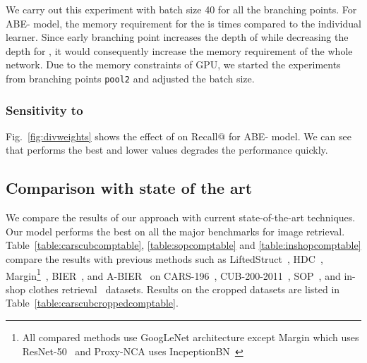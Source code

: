 \documentclass[runningheads]{llncs}
\begin{document}
We carry out this experiment with batch size 40 for all the branching points.
For ABE- model, the memory requirement for the  is  times compared to the individual learner. Since early branching point increases the depth of  while decreasing the depth for , it would consequently increase the memory requirement of the whole network.
Due to the memory constraints of GPU, we started the experiments from branching points  \texttt{pool2} and adjusted the batch size.


\subsubsection{Sensitivity to }
Fig.~\ref{fig:divweights} shows the effect of  on Recall@ for ABE- model. We can see that  performs the best and lower values degrades the performance quickly.




\subsection{Comparison with state of the art}
We compare the results of our approach with current state-of-the-art techniques.
Our model performs the best on all the major benchmarks for image retrieval.
Table~\ref{table:carscubcomptable}, \ref{table:sopcomptable} and \ref{table:inshopcomptable} compare the results with previous methods such as LiftedStruct~\cite{oh2016deep}, HDC~\cite{yuan2016hard}, Margin\footnote[2]{\label{note1}All compared methods use GoogLeNet architecture except Margin which uses ResNet-50~\cite{he2016deep}  and Proxy-NCA uses IncpeptionBN~\cite{ioffe2015batch}}~\cite{wu2017sampling}, BIER~\cite{opitz2017bier}, and A-BIER~\cite{opitz2017bier} on CARS-196~\cite{KrauseStarkDengFei-Fei_3DRR2013}, CUB-200-2011~\cite{WahCUB_200_2011}, SOP~\cite{oh2016deep}, and in-shop clothes retrieval~\cite{liu2016deepfashion} datasets.
Results on the cropped datasets are listed in Table~\ref{table:carscubcroppedcomptable}.
\end{document}
